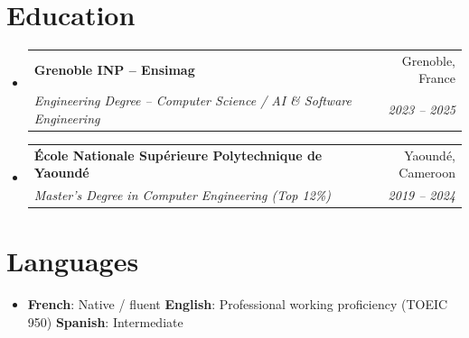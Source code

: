\documentclass[letterpaper,10.5pt]{article}
\makeatletter
\newcommand{\resumeSubheading}[4]{
  \vspace{3pt}\item
  \begin{tabular*}{0.97\textwidth}[t]{l@{\extracolsep{\fill}}r}
    \textbf{#1} & #2 \\
    \textit{\small #3} & \textit{\small #4} \\
  \end{tabular*}\vspace{1pt}
}
\newcommand{\resumeSubHeadingListStart}{\begin{itemize}[leftmargin=0.08in, label={}]}
\newcommand{\resumeSubHeadingListEnd}{\end{itemize}}
\makeatother
\begin{document}
\section{Education}
\resumeSubHeadingListStart
  \resumeSubheading
    {Grenoble INP -- Ensimag}{Grenoble, France}
    {Engineering Degree -- Computer Science / AI \& Software Engineering}{2023 -- 2025}
  \resumeSubheading
    {\'Ecole Nationale Sup\'erieure Polytechnique de Yaound\'e}{Yaound\'e, Cameroon}
    {Master's Degree in Computer Engineering (Top 12\%)}{2019 -- 2024}
\resumeSubHeadingListEnd

\section{Languages}
\begin{itemize}[leftmargin=0.08in, label={}]
  \item \textbf{French}: Native / fluent \quad \textbf{English}: Professional working proficiency (TOEIC 950) \quad \textbf{Spanish}: Intermediate
\end{itemize}
\end{document}
